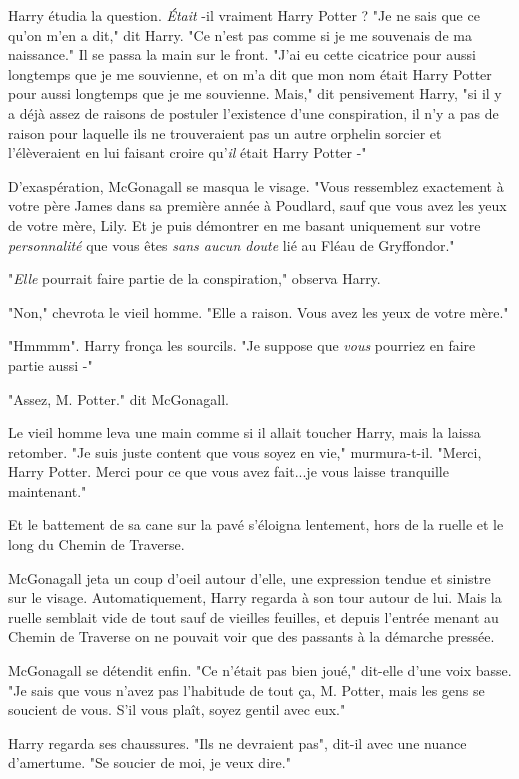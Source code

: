 Harry étudia la question. \emph{Était} -il vraiment Harry Potter ? "Je ne sais que ce qu'on m'en a dit," dit Harry. "Ce n'est pas comme si je me souvenais de ma naissance." Il se passa la main sur le front. "J'ai eu cette cicatrice pour aussi longtemps que je me souvienne, et on m'a dit que mon nom était Harry Potter pour aussi longtemps que je me souvienne. Mais," dit pensivement Harry, "si il y a déjà assez de raisons de postuler l'existence d'une conspiration, il n'y a pas de raison pour laquelle ils ne trouveraient pas un autre orphelin sorcier et l'élèveraient en lui faisant croire qu'\emph{il}  était Harry Potter -"

D'exaspération, McGonagall se masqua le visage. "Vous ressemblez exactement à votre père James dans sa première année à Poudlard, sauf que vous avez les yeux de votre mère, Lily. Et je puis démontrer en me basant uniquement sur votre \emph{personnalité}  que vous êtes \emph{sans aucun doute}  lié au Fléau de Gryffondor."

"\emph{Elle } pourrait faire partie de la conspiration," observa Harry.

"Non," chevrota le vieil homme. "Elle a raison. Vous avez les yeux de votre mère."

"Hmmmm". Harry fronça les sourcils. "Je suppose que \emph{vous}  pourriez en faire partie aussi -"

"Assez, M. Potter." dit McGonagall.

Le vieil homme leva une main comme si il allait toucher Harry, mais la laissa retomber. "Je suis juste content que vous soyez en vie," murmura-t-il. "Merci, Harry Potter. Merci pour ce que vous avez fait...je vous laisse tranquille maintenant."

Et le battement de sa cane sur la pavé s'éloigna lentement, hors de la ruelle et le long du Chemin de Traverse.

McGonagall jeta un coup d'oeil autour d'elle, une expression tendue et sinistre sur le visage. Automatiquement, Harry regarda à son tour autour de lui. Mais la ruelle semblait vide de tout sauf de vieilles feuilles, et depuis l'entrée menant au Chemin de Traverse on ne pouvait voir que des passants à la démarche pressée.

McGonagall se détendit enfin. "Ce n'était pas bien joué," dit-elle d'une voix basse. "Je sais que vous n'avez pas l'habitude de tout ça, M. Potter, mais les gens se soucient de vous. S'il vous plaît, soyez gentil avec eux."

Harry regarda ses chaussures. "Ils ne devraient pas", dit-il avec une nuance d'amertume. "Se soucier de moi, je veux dire."

